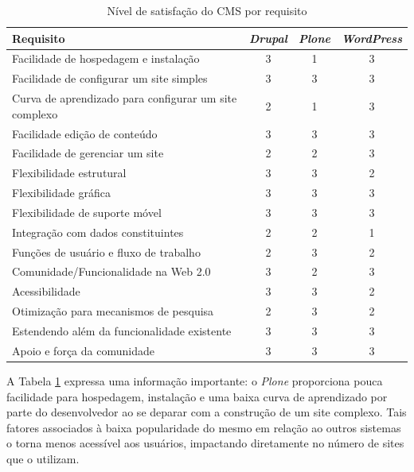 \begin{table}[h]
\centering
{}
\caption{Nível de satisfação do CMS por requisito}
\vspace{0.5cm}

\setlength{\extrarowheight}{0.25cm}
\begin{tabular}{l|c|c|c}
 
\textbf{Requisito} & \textbf{\textit{Drupal}} & \textbf{\textit{Plone}} & \textbf{\textit{WordPress}} \\ %
\hline                               %
Facilidade de hospedagem e instalação & 3 & 1 & 3 \\
Facilidade de configurar um site simples & 3 & 3 & 3 \\
Curva de aprendizado para configurar um site complexo & 2 & 1 & 3 \\
Facilidade edição de conteúdo & 3 & 3 & 3 \\
Facilidade de gerenciar um site & 2 & 2 & 3 \\
Flexibilidade estrutural & 3 & 3 & 2 \\
Flexibilidade gráfica & 3 & 3 & 3 \\
Flexibilidade de suporte móvel & 3 & 3 & 3 \\
Integração com dados constituintes & 2 & 2 & 1 \\
Funções de usuário e fluxo de trabalho & 2 & 3 & 2 \\
Comunidade/Funcionalidade na Web 2.0 & 3 & 2 & 3 \\
Acessibilidade & 3 & 3 & 2 \\
Otimização para mecanismos de pesquisa & 2 & 3 & 2 \\
Estendendo além da funcionalidade existente & 3 & 3 & 3 \\
Apoio e força da comunidade & 3 & 3 & 3 \\
\hline   
\end{tabular}
\label{nivel-cms}
\end{table}


A Tabela \ref{nivel-cms} expressa uma informação importante: o \textit{Plone} proporciona pouca facilidade para hospedagem, instalação e uma baixa curva de aprendizado por parte do desenvolvedor ao se deparar com a construção de um site complexo. Tais fatores associados à baixa popularidade do mesmo em relação ao outros sistemas o torna menos acessível aos usuários, impactando diretamente no número de sites que o utilizam.

